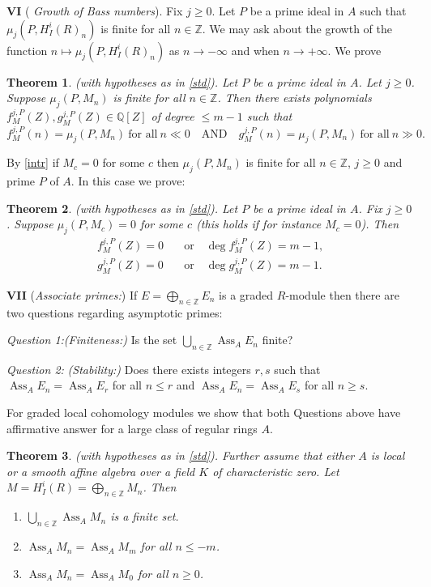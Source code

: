 \documentclass{amsart}
\newcommand{\ZZ}{\mathbb{Z} }
\newcommand{\rt}{\rightarrow}
\newcommand{\Ass}{\operatorname{Ass}}
\theoremstyle{plain}
\newtheorem{theorem}{Theorem}[section]
\theoremstyle{definition}
\theoremstyle{remark}
\begin{document}
\textbf{VI} (\textit{ Growth of Bass numbers}). Fix $j \geq 0$. Let $P$ be a prime ideal in $A$ such that $\mu_j(P, H^i_I(R)_n)$ is finite for all $n \in \ZZ$. We may ask about the growth of the function $n \mapsto \mu_j(P, H^i_I(R)_n)$ as $n \rt -\infty$ and when $n \rt + \infty$. We prove
\begin{theorem}
\label{bass-growth}(with hypotheses as in \ref{std}).  Let $P$ be a prime ideal in $A$. Let $j \geq 0$. Suppose $\mu_j(P, M_n)$ is finite for all $n \in \ZZ$. Then there exists polynomials $f_M^{j,P}(Z), g_M^{j,P}(Z) \in \mathbb{Q}[Z]$ of degree $\leq m - 1$ such that
\[
f_M^{j,P}(n) = \mu_j(P, M_n) \ \text{for all} \ n \ll 0  \quad \text{AND} \quad  g_M^{j,P}(n) = \mu_j(P, M_n) \ \text{for all} \ n \gg 0.
\]
\end{theorem}
By \ref{intr} if $M_c = 0$ for some $c$ then $\mu_j(P, M_n)$ is finite for all $n \in \ZZ$, $j \geq 0$ and  prime $P$ of $A$. In this case we prove:
\begin{theorem}\label{bass-growth-max}
(with hypotheses as in \ref{std}).  Let $P$ be a prime ideal in $A$. Fix $j \geq 0$. Suppose $\mu_j(P,M_c) = 0$ for some $c$ (this holds if for instance $M_c =0$). Then
\begin{align*}
f_M^{j,P}(Z) = 0  \quad &\text{or} \quad   \deg f_M^{j,P}(Z) = m -1, \\
g_M^{j,P}(Z) = 0  \quad &\text{or} \quad   \deg g_M^{j,P}(Z) = m -1.
\end{align*}
\end{theorem}
\textbf{VII}
(\textit{Associate primes:}) If $E = \bigoplus_{n \in \ZZ} E_n$ is a graded $R$-module then  there are two questions regarding asymptotic primes:

\textit{Question 1:}\textit{(Finiteness:)} Is the set 
$\bigcup_{n \in \ZZ} \Ass_A E_n   $ finite?

\textit{Question 2:} \textit{(Stability:)} Does there exists integers $r , s$ such
that $\Ass_A E_n = \Ass_A E_r$ for all $n \leq r$ and $\Ass_A E_n = \Ass_A E_s$ for all $n \geq s$.

For graded local cohomology modules we show that both Questions above have affirmative answer for a large class of regular rings $A$. 
\begin{theorem}\label{ass}(with hypotheses as in \ref{std}). Further assume that either $A$ is local or a smooth affine algebra over a field $K$ of characteristic zero. Let $M = H^i_I(R) = \bigoplus_{n \in \ZZ}M_n$. Then
\begin{enumerate}[\rm (1)]
\item
$\bigcup_{n \in \ZZ} \Ass_A M_n   $ is a finite set.
\item
$\Ass_A M_n = \Ass_A M_m$ for all $n \leq -m$.
\item
$\Ass_A M_n = \Ass_A M_0$ for all $n \geq 0$.
\end{enumerate}
\end{theorem}
\end{document}
